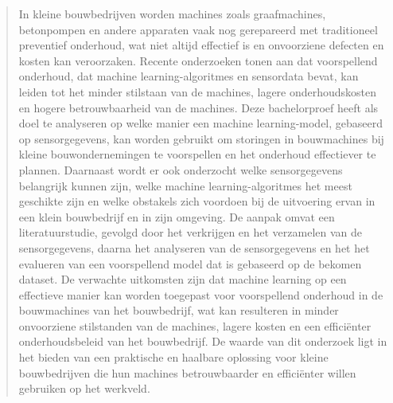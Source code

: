 \documentclass[dutch,dit,thesis]{hogentreport}
\begin{document}
\begin{abstract}
    In kleine bouwbedrijven worden machines zoals graafmachines, betonpompen en andere apparaten vaak nog gerepareerd met traditioneel preventief onderhoud, wat niet altijd effectief is en onvoorziene defecten en kosten kan veroorzaken. Recente onderzoeken tonen aan dat voorspellend onderhoud, dat machine learning-algoritmes en sensordata bevat, kan leiden tot het minder stilstaan van de machines, lagere onderhoudskosten en hogere betrouwbaarheid van de machines. Deze bachelorproef heeft als doel te analyseren op welke manier een machine learning-model, gebaseerd op sensorgegevens, kan worden gebruikt om storingen in bouwmachines bij kleine bouwondernemingen te voorspellen en het onderhoud effectiever  te plannen. Daarnaast wordt er ook onderzocht welke sensorgegevens belangrijk kunnen zijn, welke machine learning-algoritmes het meest geschikte zijn en welke obstakels zich voordoen bij de uitvoering ervan in een klein bouwbedrijf en in zijn omgeving. De aanpak omvat een literatuurstudie, gevolgd door het verkrijgen en het verzamelen van de sensorgegevens, daarna het analyseren van de sensorgegevens en het het evalueren van een voorspellend model dat is gebaseerd op de bekomen dataset. De verwachte uitkomsten zijn dat machine learning op een effectieve manier kan worden toegepast voor voorspellend onderhoud in de bouwmachines van het bouwbedrijf, wat kan resulteren in minder onvoorziene stilstanden van de machines, lagere kosten en een efficiënter onderhoudsbeleid van het bouwbedrijf. De waarde van dit onderzoek ligt in het bieden van een praktische en haalbare oplossing voor kleine bouwbedrijven die hun machines betrouwbaarder en efficiënter willen gebruiken op het werkveld. 
\end{abstract}



%


\backmatter{}

\setlength\bibitemsep{2pt} %
\printbibliography[heading=bibintoc]
\end{document}
